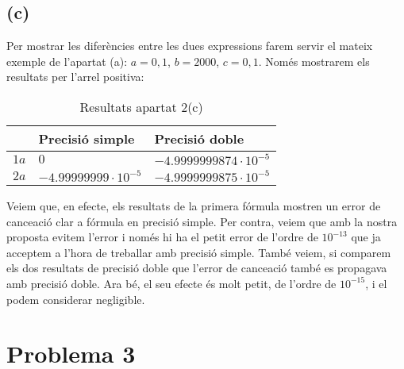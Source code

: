\documentclass[a4paper,10pt]{article}
\begin{document}
  \subsection*{(c)}
  Per mostrar les diferències entre les dues expressions farem servir el mateix exemple de l'apartat (a): $a = 0,1$, $b = 2000$, $c = 0,1$. Només mostrarem els resultats per l'arrel positiva:
  \begin{table}[H]
    \begin{center}
      \begin{tabular}[c]{|p{10mm}|p{35mm}|p{35mm}|}
      \hline 
      & Precisió simple & Precisió doble \\ 
      \hline 
      $1a$
      &
      $0$
      &
      $-4.9999999874 \cdot 10^{-5}$ \\
      \hline
      $2a$
      &
      $-4.99999999 \cdot 10^{-5}$
      &
      $-4.9999999875 \cdot 10^{-5}$\\
      \hline
      \end{tabular}
    \caption{Resultats apartat 2(c)}
    \end{center}
  \end{table}
  Veiem que, en efecte, els resultats de la primera fórmula mostren un error de cance\lgem ació clar a fórmula en precisió simple. Per contra, veiem que amb la nostra proposta evitem l'error i només hi ha el petit error de l'ordre de $10^{-13}$ que ja acceptem a l'hora de treballar amb precisió simple. També veiem, si comparem els dos resultats de precisió doble que l'error de cance\lgem ació també es propagava amb precisió doble. Ara bé, el seu efecte és molt petit, de l'ordre de $10^{-15}$, i el podem considerar negligible.
  \newpage
\section*{Problema 3}
\end{document}

